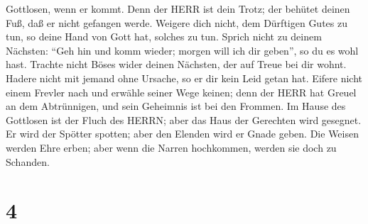 Gottlosen, wenn er kommt.  Denn der HERR ist dein Trotz;
der behütet deinen Fuß, daß er nicht gefangen werde. 
Weigere dich nicht, dem Dürftigen Gutes zu tun, so deine Hand von Gott
hat, solches zu tun.  Sprich nicht zu deinem Nächsten:
``Geh hin und komm wieder; morgen will ich dir geben'', so du es wohl
hast.  Trachte nicht Böses wider deinen Nächsten, der auf
Treue bei dir wohnt.  Hadere nicht mit jemand ohne Ursache,
so er dir kein Leid getan hat.  Eifere nicht einem Frevler
nach und erwähle seiner Wege keinen;  denn der HERR hat
Greuel an dem Abtrünnigen, und sein Geheimnis ist bei den Frommen.
 Im Hause des Gottlosen ist der Fluch des HERRN; aber das
Haus der Gerechten wird gesegnet.  Er wird der Spötter
spotten; aber den Elenden wird er Gnade geben.  Die Weisen
werden Ehre erben; aber wenn die Narren hochkommen, werden sie doch zu
Schanden.

\hypertarget{section-3}{%
\section{4}\label{section-3}}

